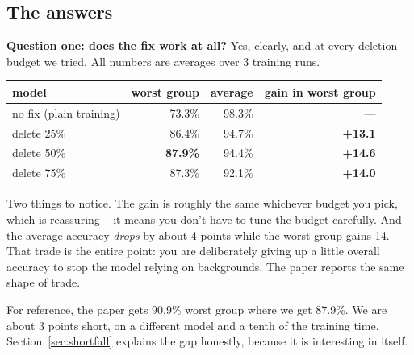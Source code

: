 \documentclass[11pt]{article}
\begin{document}
\begin{center}
\end{center}

\subsection{The answers}

\textbf{Question one: does the fix work at all?} Yes, clearly, and at every
deletion budget we tried. All numbers are averages over 3 training runs.

\begin{center}\small
\begin{tabular}{@{}lrrr@{}}
\toprule
model & worst group & average & gain in worst group \\
\midrule
no fix (plain training) & 73.3\% & 98.3\% & --- \\
delete 25\% & 86.4\% & 94.7\% & \textbf{+13.1} \\
delete 50\% & \textbf{87.9\%} & 94.4\% & \textbf{+14.6} \\
delete 75\% & 87.3\% & 92.1\% & \textbf{+14.0} \\
\bottomrule
\end{tabular}
\end{center}

\noindent Two things to notice. The gain is roughly the same whichever budget
you pick, which is reassuring -- it means you don't have to tune the budget
carefully. And the average accuracy \emph{drops} by about 4 points while the
worst group gains 14. That trade is the entire point: you are deliberately
giving up a little overall accuracy to stop the model relying on backgrounds.
The paper reports the same shape of trade.

For reference, the paper gets 90.9\% worst group where we get 87.9\%. We are
about 3 points short, on a different model and a tenth of the training time.
Section~\ref{sec:shortfall} explains the gap honestly, because it is
interesting in itself.
\end{document}

